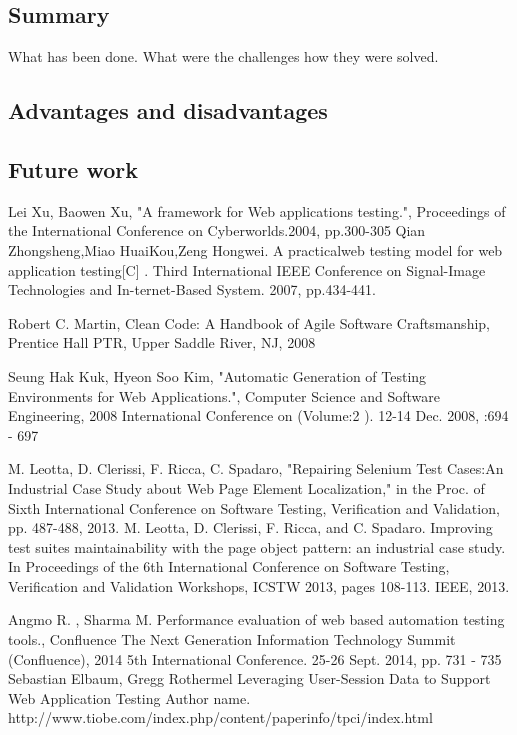 \documentclass[12pt,a4paper,english%
]{tutthesis}
\begin{document}
 	\subsection {Summary}
 	  What has been done. What were the challenges how they were solved.
 	\subsection {Advantages and disadvantages}
 	\subsection {Future work}
 	
 	
	\begin{thebibliography}{7}
	
			Lei Xu, Baowen Xu,
			"A framework for Web applications testing.",
			Proceedings of the International Conference on Cyberworlds.2004, pp.300-305
		Qian Zhongsheng,Miao HuaiKou,Zeng Hongwei.
		 A practicalweb testing model for web application testing[C] .
		 Third International IEEE Conference on Signal-Image Technologies and
		 In-ternet-Based System. 2007, pp.434-441.
		 
		Robert C. Martin,
		Clean Code: A Handbook of Agile Software Craftsmanship,
		Prentice Hall PTR, Upper Saddle River, NJ, 2008
		
		Seung Hak Kuk, Hyeon Soo Kim,			
		"Automatic Generation of Testing Environments for Web Applications.",
		Computer Science and Software Engineering, 2008 International Conference on
		(Volume:2 ). 12-14 Dec. 2008, :694 - 697
		
		M. Leotta, D. Clerissi, F. Ricca, C. Spadaro,
		"Repairing Selenium Test Cases:An Industrial Case Study about Web Page
		 Element Localization," in the Proc. of Sixth International Conference on Software Testing, Verification and Validation, pp. 487-488, 2013. 
		M. Leotta, D. Clerissi, F. Ricca, and C. Spadaro. Improving test suites
		maintainability with the page object pattern: an industrial case study.
		In Proceedings of the 6th International Conference on Software Testing, Verification and Validation Workshops,
		ICSTW 2013, pages 108-113. IEEE, 2013. 
		
		
		Angmo R. , Sharma M.	
		Performance evaluation of web based automation testing tools.,
		Confluence The Next Generation Information Technology Summit (Confluence),
		2014 5th International Conference. 25-26 Sept. 2014, pp. 731 - 735
		Sebastian Elbaum, Gregg Rothermel
		Leveraging User-Session Data to Support Web Application Testing
		 Author name.
		http://www.tiobe.com/index.php/content/paperinfo/tpci/index.html
		

\end{thebibliography}
\end{document}
